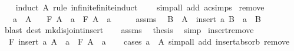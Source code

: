\begin{isabellebody}
%
\isadelimproof
\ \ %
\endisadelimproof
%
\isatagproof
{}\isamarkupfalse%
\ {\isacharparenleft}{\kern0pt}induct\ A\ rule{\isacharcolon}{\kern0pt}\ infinite{\isacharunderscore}{\kern0pt}finite{\isacharunderscore}{\kern0pt}induct{\isacharparenright}{\kern0pt}\isanewline
\ \ \ \ {\isacharparenleft}{\kern0pt}simp{\isacharunderscore}{\kern0pt}all\ add{\isacharcolon}{\kern0pt}\ ac{\isacharunderscore}{\kern0pt}simps{\isacharparenright}{\kern0pt}%
\endisatagproof
{\isafoldproof}%
%
\isadelimproof
\isanewline
%
\endisadelimproof
\isanewline
{}\isamarkupfalse%
\ remove{\isacharcolon}{\kern0pt}\isanewline
\ \ \ {\isachardoublequoteopen}a\ {\isasymin}\ A{\isachardoublequoteclose}\isanewline
\ \ \ {\isachardoublequoteopen}F\ A\ {\isacharequal}{\kern0pt}\ a\ \isactrlbold {\isacharasterisk}{\kern0pt}\ F\ {\isacharparenleft}{\kern0pt}A\ {\isacharminus}{\kern0pt}\ {\isacharbraceleft}{\kern0pt}a{\isacharbraceright}{\kern0pt}{\isacharparenright}{\kern0pt}{\isachardoublequoteclose}\isanewline
%
\isadelimproof
%
\endisadelimproof
%
\isatagproof
{}\isamarkupfalse%
\ {\isacharminus}{\kern0pt}\isanewline
\ \ \isamarkupfalse%
\ assms\ \isamarkupfalse%
\ B\ \ {\isachardoublequoteopen}A\ {\isacharequal}{\kern0pt}\ insert\ a\ B{\isachardoublequoteclose}\ \ {\isachardoublequoteopen}a\ {\isasymnotin}\ B{\isachardoublequoteclose}\isanewline
\ \ \ \ \isamarkupfalse%
\ {\isacharparenleft}{\kern0pt}blast\ dest{\isacharcolon}{\kern0pt}\ mk{\isacharunderscore}{\kern0pt}disjoint{\isacharunderscore}{\kern0pt}insert{\isacharparenright}{\kern0pt}\isanewline
\ \ \isamarkupfalse%
\ assms\ \isamarkupfalse%
\ {\isacharquery}{\kern0pt}thesis\ \isamarkupfalse%
\ simp\isanewline
{}\isamarkupfalse%
%
\endisatagproof
{\isafoldproof}%
%
\isadelimproof
\isanewline
%
\endisadelimproof
\isanewline
{}\isamarkupfalse%
\ insert{\isacharunderscore}{\kern0pt}remove{\isacharcolon}{\kern0pt}\isanewline
\ \ {\isachardoublequoteopen}F\ {\isacharparenleft}{\kern0pt}insert\ a\ A{\isacharparenright}{\kern0pt}\ {\isacharequal}{\kern0pt}\ a\ \isactrlbold {\isacharasterisk}{\kern0pt}\ F\ {\isacharparenleft}{\kern0pt}A\ {\isacharminus}{\kern0pt}\ {\isacharbraceleft}{\kern0pt}a{\isacharbraceright}{\kern0pt}{\isacharparenright}{\kern0pt}{\isachardoublequoteclose}\isanewline
%
\isadelimproof
\ \ %
\endisadelimproof
%
\isatagproof
{}\isamarkupfalse%
\ {\isacharparenleft}{\kern0pt}cases\ {\isachardoublequoteopen}a\ {\isasymin}\ A{\isachardoublequoteclose}{\isacharparenright}{\kern0pt}\ {\isacharparenleft}{\kern0pt}simp{\isacharunderscore}{\kern0pt}all\ add{\isacharcolon}{\kern0pt}\ insert{\isacharunderscore}{\kern0pt}absorb\ remove{\isacharparenright}{\kern0pt}%

\end{isabellebody}
